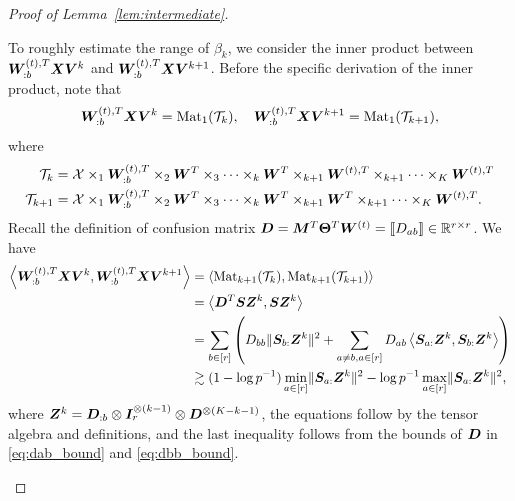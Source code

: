 \documentclass[lettersize,onecolumn,journal]{IEEEtran}
\theoremstyle{definition}
\theoremstyle{definition}
\newcommand{\of}[1]{\left(#1\right)}
\newcommand{\ang}[1]{\left\langle#1\right\rangle}
\begin{document}
\begin{proof}[Proof of Lemma~\ref{lem:intermediate}]
\begin{enumerate}[wide]
    To roughly estimate the range of $\beta_k$, we consider the inner product between $\bm{W}_{:b}^{(t),T} \bm X \bm{V}^k$ and $\bm{W}_{:b}^{(t),T} \bm X \bm{V}^{k+1}$. Before the specific derivation of the inner product, note that 
    \begin{equation}
        \bm{W}_{:b}^{(t),T} \bm X \bm{V}^k = \text{Mat}_1(\mathcal{T}_k), \quad  \bm{W}_{:b}^{(t),T} \bm X \bm{V}^{k+1} = \text{Mat}_1(\mathcal{T}_{k+1}),
    \end{equation}
    where 
    \begin{align}
        \mathcal{T}_k &= \mathcal{X} \times_1  \bm{W}_{:b}^{(t),T} \times_2 \bm{W}^T \times_3 \cdots \times_k \bm{W}^T \times_{k+1} \bm{W}^{(t),T} \times_{k+1} \cdots \times_K \bm{W}^{(t),T}\\
        \mathcal{T}_{k+1} &= \mathcal{X} \times_1  \bm{W}_{:b}^{(t),T} \times_2 \bm{W}^T \times_3 \cdots \times_k \bm{W}^T \times_{k+1} \bm{W}^{T} \times_{k+1} \cdots \times_K \bm{W}^{(t),T}. 
    \end{align}
    Recall the definition of confusion matrix $\bm{D} = \bm M^T \boldsymbol{\Theta}^T \bm{W}^{(t)} = \llbracket D_{ab} \rrbracket \in \mathbb{R}^{r \times r}$.
 We have 
    \begin{align}
         \ang{\mW_{:b}^{(t),T} \mX \mV^k , \mW_{:b}^{(t),T} \mX \mV^{k+1}} 
         &  =\ang{ \mat_{k+1}(\tT_k), \mat_{k+1}(\tT_{k+1}) } \label{eq:j11_tensormat} \\
  & =  \ang{ \mD^T \mS \mZ^k ,  \mS \mZ^k   }\\
         & = \sum_{b \in [r]} \of{ D_{bb} \onormSize{}{\mS_{b:}\mZ^k}^2 + \sum_{a \neq b, a \in [r]} D_{ab} \ang{\mS_{a:} \mZ^k, \mS_{b:} \mZ^k}} \\
         & \gtrsim (1 - \log p^{-1}) \min_{a \in [r]}\onormSize{}{\mS_{a:}\mZ^k}^2 - \log p^{-1} \max_{a \in [r]} \onormSize{}{\mS_{a:}\mZ^k}^2, \label{eq:j11inner}
    \end{align}
    where $\bm Z^k = \bm{D}_{:b} \otimes \bm I_r^{\otimes (k-1)} \otimes  \bm{D}^{\otimes (K-k-1)}$, the equations follow by the tensor algebra and definitions, and the last inequality follows from the bounds of $\bm{D}$ in \eqref{eq:dab_bound} and \eqref{eq:dbb_bound}. 
    

\end{enumerate}
\end{proof}
\end{document}
